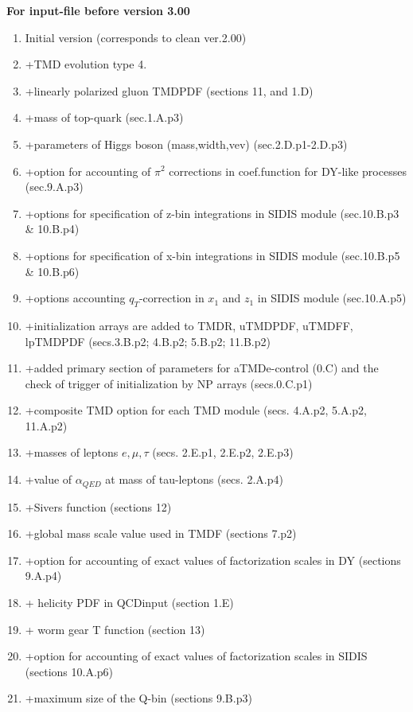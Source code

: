\documentclass[prd,nofootinbib,eqsecnum,final]{revtex4}
\renewcommand{\(}{\left(}
\renewcommand{\)}{\right)}
\renewcommand{\[}{\left[}
\renewcommand{\]}{\right]}
\begin{document}
\begin{center}
\textbf{For input-file before version 3.00}
\end{center}
\begin{enumerate}
\item Initial version (corresponds to clean ver.2.00)
\item +TMD evolution type 4.
\item +linearly polarized gluon TMDPDF (sections 11, and 1.D)
\item +mass of top-quark (sec.1.A.p3)
\item +parameters of Higgs boson (mass,width,vev) (sec.2.D.p1-2.D.p3)
\item +option for accounting of $\pi^2$ corrections in coef.function for DY-like processes (sec.9.A.p3)
\item +options for specification of z-bin integrations in SIDIS module (sec.10.B.p3 \& 10.B.p4)
\item +options for specification of x-bin integrations in SIDIS module (sec.10.B.p5 \& 10.B.p6)
\item +options accounting $q_T$-correction in $x_1$ and $z_1$ in SIDIS module (sec.10.A.p5)
\item +initialization arrays are added to TMDR, uTMDPDF, uTMDFF, lpTMDPDF (secs.3.B.p2; 4.B.p2; 5.B.p2; 11.B.p2)
\item +added primary section of parameters for aTMDe-control (0.C) and the check of trigger of initialization by NP arrays (secs.0.C.p1)
\item +composite TMD option for each TMD module (secs. 4.A.p2, 5.A.p2, 11.A.p2)
\item +masses of leptons $e,\mu,\tau$ (secs. 2.E.p1, 2.E.p2, 2.E.p3)
\item +value of $\alpha_{QED}$ at mass of tau-leptons (secs. 2.A.p4)
\item +Sivers function (sections 12)
\item +global mass scale value used in TMDF (sections 7.p2)
\item +option for accounting of exact values of factorization scales in DY (sections 9.A.p4)
\item + helicity PDF in QCDinput (section 1.E)
\item + worm gear T function (section 13)
\item +option for accounting of exact values of factorization scales in SIDIS (sections 10.A.p6)
\item +maximum size of the Q-bin (sections 9.B.p3)
\end{enumerate}
\end{document}
